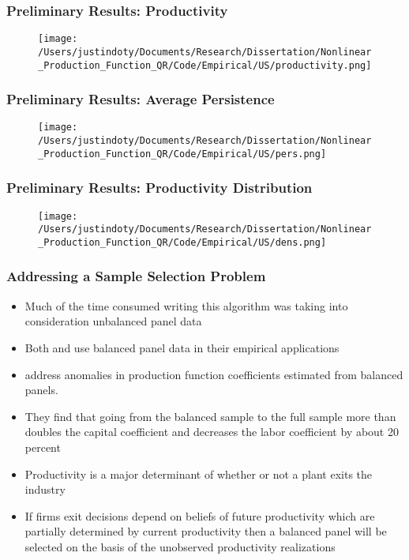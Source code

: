 \documentclass{beamer}
\begin{document}
\begin{frame}
\frametitle{Preliminary Results: Productivity}
\begin{figure}[ht]
\centering
\texttt{[image: /Users/justindoty/Documents/Research/Dissertation/Nonlinear\_Production\_Function\_QR/Code/Empirical/US/productivity.png]}
\end{figure}
\end{frame}

\begin{frame}
\frametitle{Preliminary Results: Average Persistence}
\begin{figure}[ht]
\centering
\texttt{[image: /Users/justindoty/Documents/Research/Dissertation/Nonlinear\_Production\_Function\_QR/Code/Empirical/US/pers.png]}
\end{figure}
\end{frame}

\begin{frame}
\frametitle{Preliminary Results: Productivity Distribution}
\begin{figure}[ht]
\centering
\texttt{[image: /Users/justindoty/Documents/Research/Dissertation/Nonlinear\_Production\_Function\_QR/Code/Empirical/US/dens.png]}
\end{figure}
\end{frame}

\begin{frame}
\frametitle{Addressing a Sample Selection Problem}
\begin{itemize}
	\item Much of the time consumed writing this algorithm was taking into consideration unbalanced panel data
	\item Both \cite{Arellano2016} and \cite{Arellano2017} use balanced panel data in their empirical applications
	\item \cite{Olley1996} address anomalies in production function coefficients estimated from balanced panels. 
	\item They find that going from the balanced sample to the full sample more than doubles the capital coefficient and decreases the labor coefficient by about 20 percent
	\item Productivity is a major determinant of whether or not a plant exits the industry
	\item If firms exit decisions depend on beliefs of future productivity which are partially determined by current productivity then a balanced panel will be selected on the basis of the unobserved productivity realizations
\end{itemize}
\end{frame}
\end{document}
